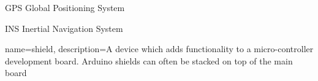%
%

{GPS}
{Global Positioning System}

{INS}
{Inertial Navigation System}

{name=shield,
description={A device which adds functionality to a micro-controller development board. Arduino shields can often be stacked on top of the main board}
}

